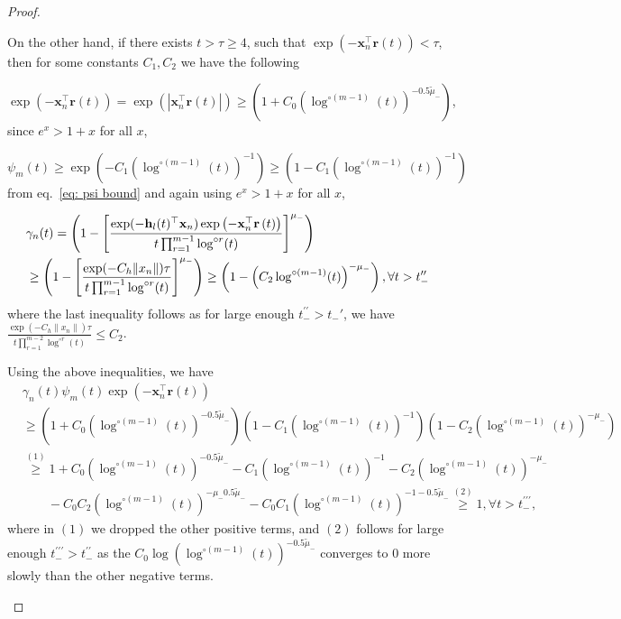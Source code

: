 \documentclass[twoside,11pt,english]{article}
\begin{document}
\begin{proof}
\begin{asparaenum}
\begin{compactenum}
On the other hand, if there exists $t>\tau\ge4$, such that $\exp\left(-\mathbf{x}_{n}^{\top}\mathbf{r}\left(t\right)\right)<\tau$, then for some constants $C_1,C_2$ we have the following 
\begin{compactenum}[(i)]
\item  $\exp(-\mathbf{x}_{n}^{\top}\mathbf{r}\left(t\right))=\exp(|\mathbf{x}_{n}^{\top}\mathbf{r}\left(t\right)|)\ge \left(1+C_0\left(\log^{\circ (m-1)}(t)\right)^{-0.5\tilde{\mu}_-}\right)$,  since $e^x>1+x$ for all $x$,
\item  $\psi_m(t)\ge\exp\left(-C_1\left(\log^{\circ (m-1)}(t)\right)^{-1}\right)\ge \left(1-C_1\left(\log^{\circ (m-1)}(t)\right)^{-1}\right)$  from eq.~\ref{eq: psi bound}   and again using  $e^x>1+x$ for all $x$,
\item 
\begin{align*}
    &\gamma_n(t)=\left(1-\left[\frac{\exp(-\mathbf{h}_l(t)^\top \mathbf{x}_{n})\exp\left(-\mathbf{x}_{n}^{\top}\mathbf{r}\left(t\right)\right)}{t\prod_{r=1}^{m-1}\log^{\circ r}(t)}\right]^{\mu_-}\right)& \\
    &\ge \left(1-\left[\frac{\exp(-C_h\|x_n\|)\tau}{t\prod_{r=1}^{m-1}\log^{\circ r}(t)}\right]^{\mu_-}\right)\ge\left(1-\left(C_2\log^{\circ (m-1)}(t)\right)^{-\mu_-}\right), \forall t>t_-^{\prime\prime}
\end{align*} 
where the last inequality follows as for large enough $t_-^{\prime\prime}>t_-'$,  we have $\frac{\exp(-C_h\|x_n\|)\tau}{t\prod_{r=1}^{m-2}\log^{\circ r}(t)}\le C_2$.
\end{compactenum}

Using the above inequalities, we have {\small
\begin{align}
&\gamma_n(t)\psi_m(t)\exp\left(-\mathbf{x}_{n}^{\top}\mathbf{r}\left(t\right)\right)\nonumber\\
&\ge\left(1+C_0\left(\log^{\circ (m-1)}(t)\right)^{-0.5\tilde{\mu}_-}\right)\left(1-C_1\left(\log^{\circ (m-1)}(t)\right)^{-1}\right)\left(1-C_2\left(\log^{\circ (m-1)}(t)\right)^{-\mu_-}\right)\nonumber\\
&\overset{(1)}\ge 1+C_0\left(\log^{\circ (m-1)}(t)\right)^{-0.5\tilde{\mu}_-}-C_1\left(\log^{\circ (m-1)}(t)\right)^{-1}-C_2\left(\log^{\circ (m-1)}(t)\right)^{-{\mu}_-}\nonumber\\
&\quad\quad -C_0C_2\left(\log^{\circ (m-1)}(t)\right)^{-\mu_-0.5\tilde{\mu}_-}-C_0C_1\left(\log^{\circ (m-1)}(t)\right)^{-1-0.5\tilde{\mu}_-}\overset{(2)}\ge 1, \forall t>t_-^{\prime\prime\prime},
\label{eq:case2b}
\end{align}}
where in $(1)$ we dropped the other positive terms, and $(2)$ follows for large enough $t_-^{\prime\prime\prime}>t_-^{\prime\prime}$ as the $C_0\log\left(\log^{\circ (m-1)}(t)\right)^{-0.5\tilde{\mu}_-}$   converges to $0$ more slowly than the other negative terms.


\end{compactenum}
\end{asparaenum}
\end{proof}
\end{document}
